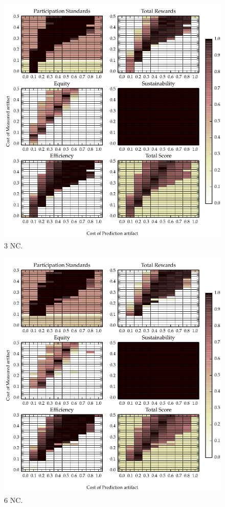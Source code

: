 \begin{figure}
\includegraphics{gfx/kc/static_1_3nc.pdf} 
\caption{3 NC.}
\end{figure}

\begin{figure}
\includegraphics{gfx/kc/static_1_6nc.pdf} 
\caption{6 NC.}
\end{figure}

